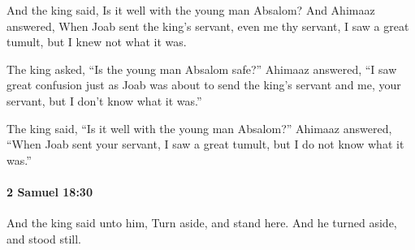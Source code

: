 			\begin{versebox}
					\item[BHS] 
					\item[ASV] And the king said, Is it well with the young man Absalom? And Ahimaaz answered, When Joab sent the king's servant, even me thy servant, I saw a great tumult, but I knew not what it was.
					\item[NIV] The king asked, “Is the young man Absalom safe?” Ahimaaz answered, “I saw great confusion just as Joab was about to send the king’s servant and me, your servant, but I don’t know what it was.”
					\item[NRSV] The king said, “Is it well with the young man Absalom?” Ahimaaz answered, “When Joab sent your servant, I saw a great tumult, but I do not know what it was.”
			\end{versebox}

		\paragraph{2 Samuel 18:30} %
			\label{2SAMUEL-18-30}

			And the king said unto him, Turn aside, and stand here. And he turned aside, and stood still.

